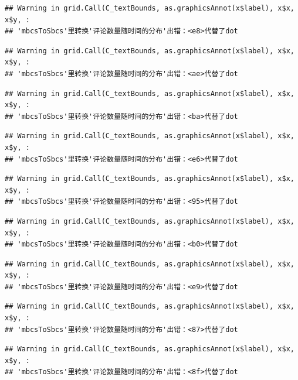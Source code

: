 \documentclass[
]{article}
\begin{document}
\begin{verbatim}
## Warning in grid.Call(C_textBounds, as.graphicsAnnot(x$label), x$x, x$y, :
## 'mbcsToSbcs'里转换'评论数量随时间的分布'出错：<e8>代替了dot
\end{verbatim}

\begin{verbatim}
## Warning in grid.Call(C_textBounds, as.graphicsAnnot(x$label), x$x, x$y, :
## 'mbcsToSbcs'里转换'评论数量随时间的分布'出错：<ae>代替了dot
\end{verbatim}

\begin{verbatim}
## Warning in grid.Call(C_textBounds, as.graphicsAnnot(x$label), x$x, x$y, :
## 'mbcsToSbcs'里转换'评论数量随时间的分布'出错：<ba>代替了dot
\end{verbatim}

\begin{verbatim}
## Warning in grid.Call(C_textBounds, as.graphicsAnnot(x$label), x$x, x$y, :
## 'mbcsToSbcs'里转换'评论数量随时间的分布'出错：<e6>代替了dot
\end{verbatim}

\begin{verbatim}
## Warning in grid.Call(C_textBounds, as.graphicsAnnot(x$label), x$x, x$y, :
## 'mbcsToSbcs'里转换'评论数量随时间的分布'出错：<95>代替了dot
\end{verbatim}

\begin{verbatim}
## Warning in grid.Call(C_textBounds, as.graphicsAnnot(x$label), x$x, x$y, :
## 'mbcsToSbcs'里转换'评论数量随时间的分布'出错：<b0>代替了dot
\end{verbatim}

\begin{verbatim}
## Warning in grid.Call(C_textBounds, as.graphicsAnnot(x$label), x$x, x$y, :
## 'mbcsToSbcs'里转换'评论数量随时间的分布'出错：<e9>代替了dot
\end{verbatim}

\begin{verbatim}
## Warning in grid.Call(C_textBounds, as.graphicsAnnot(x$label), x$x, x$y, :
## 'mbcsToSbcs'里转换'评论数量随时间的分布'出错：<87>代替了dot
\end{verbatim}

\begin{verbatim}
## Warning in grid.Call(C_textBounds, as.graphicsAnnot(x$label), x$x, x$y, :
## 'mbcsToSbcs'里转换'评论数量随时间的分布'出错：<8f>代替了dot
\end{verbatim}
\end{document}
